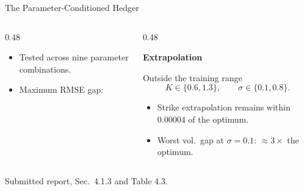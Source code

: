 \begin{frame}[t]{The Parameter-Conditioned Hedger}
\begin{columns}[T,onlytextwidth]
\begin{column}{0.48\textwidth}
\vspace{-0.12cm}

{\footnotesize
\begin{itemize}
    \setlength{\itemsep}{0.11cm}

    \item Tested across nine parameter combinations.

    \item Maximum RMSE gap:



\end{itemize}
}

\end{column}

\begin{column}{0.48\textwidth}

\centering
{\small\bfseries Extrapolation}

\vspace{0.07cm}

{\footnotesize
Outside the training range
\[
K\in\{0.6,1.3\},
\qquad
\sigma\in\{0.1,0.8\}.
\]
}

\vspace{-0.12cm}

{\footnotesize
\begin{itemize}
    \setlength{\itemsep}{0.11cm}

    \item Strike extrapolation remains within \(0.00004\) of the
    optimum.

    \item Worst vol.\ gap at $\sigma=0.1$: $\approx 3\times$ the optimum.

\end{itemize}
}

\end{column}

\end{columns}

\vspace{0.04cm}




\vspace{0.01cm}

{\tiny\color{Slate}
Submitted report, Sec.\ 4.1.3 and Table 4.3.
}


\end{frame}
